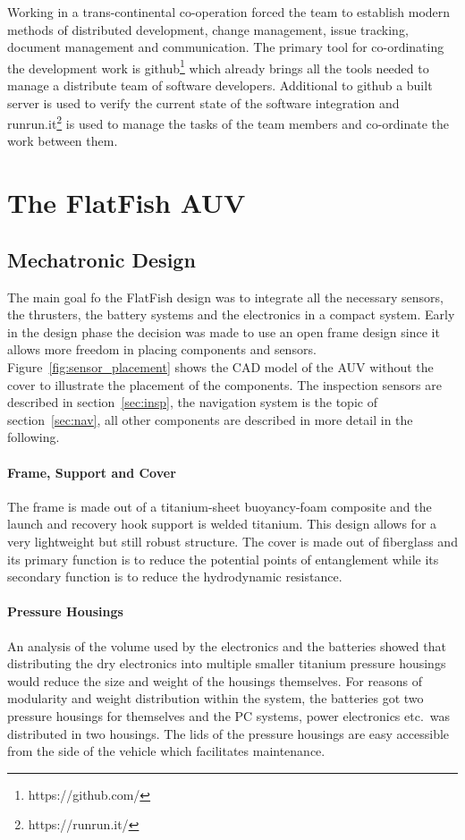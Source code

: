 \documentclass[conference]{IEEEtran}
\begin{document}
Working in a trans-continental co-operation forced the team to establish modern methods of
distributed development, change management, issue tracking, document management and
communication. The primary tool for co-ordinating the development work is
github\footnote{https://github.com/} which already brings all the tools needed to manage a
distribute team of software developers. Additional to github a built server is used to
verify the current state of the software integration and
runrun.it\footnote{https://runrun.it/} is used to manage the tasks of the team members and
co-ordinate the work between them. 

\section{The FlatFish AUV}

\subsection{Mechatronic Design}

The main goal fo the FlatFish design was to integrate all the necessary sensors, the 
thrusters, the battery systems and the electronics in a compact system. Early in the design 
phase the decision was made to use an open frame design since it allows more freedom in 
placing components and sensors. Figure~\ref{fig:sensor_placement} shows the CAD model 
of the AUV without the cover to illustrate the placement of the components. The inspection 
sensors are described in section~\ref{sec:insp}, the navigation system is the topic of 
section~\ref{sec:nav}, all other components are described in more detail in the following.

\paragraph{\textbf{Frame, Support and Cover}} The frame is made out of a titanium-sheet 
buoyancy-foam composite and the launch and recovery hook support is welded titanium. 
This design allows for a very lightweight but still robust structure. The cover is made out of 
fiberglass and its primary function is to reduce the potential points of entanglement while its 
secondary function is to reduce the hydrodynamic resistance.

\paragraph{\textbf{Pressure Housings}} An analysis of the volume used by the electronics 
and the batteries showed that distributing the dry electronics into multiple smaller titanium 
pressure housings would reduce the size and weight of the housings themselves. For 
reasons of modularity and weight distribution within the system, the batteries got two 
pressure housings for themselves and the PC systems, power electronics etc.~was 
distributed in two housings. The lids of the pressure housings are easy accessible from the 
side of the vehicle which facilitates maintenance.
\end{document}
